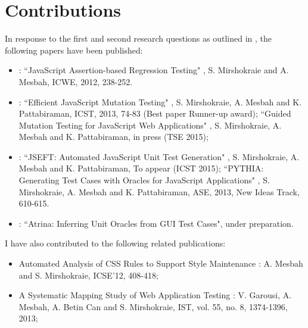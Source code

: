 \section{Contributions} \label{Sec:contrib}
In response to the first and second research questions as outlined in , the following papers have been published:
\begin{itemize}
\item {}: ``JavaScript Assertion-based Regression Testing" \cite{mirshokraie:icwe12},
S. Mirshokraie and A. Mesbah, ICWE, 2012, 238-252.
\item {}: ``Efficient JavaScript Mutation Testing" \cite{mirshokraie:icst13},
S. Mirshokraie, A. Mesbah and K. Pattabiraman, ICST, 2013, 74-83 (Best paper Runner-up award);
``Guided Mutation Testing for JavaScript Web Applications" \cite{mirshokraie:tse15},
S. Mirshokraie, A. Mesbah and K. Pattabiraman, in press (TSE 2015);
\item {}: ``JSEFT: Automated JavaScript Unit Test Generation" \cite{mirshokraie:icst15},
S. Mirshokraie, A. Mesbah and K. Pattabiraman, To appear (ICST 2015); ``PY\-THIA: Generating Test Cases with Oracles
for JavaScript Applications" \cite{shabnam:ase13},
S. Mirshokraie, A. Mesbah and K. Pattabiraman, ASE, 2013, New Ideas Track, 610-615.
\item {}: ``Atrina: Inferring Unit Oracles from GUI Test Cases", under preparation.
\end{itemize}

I have also contributed to the following related publications:
\begin{itemize}
\item Automated Analysis of CSS Rules to Support Style Maintenance \cite{mesbah:icse12}: 
A. Mesbah and S. Mirshokraie, ICSE'12, 408-418;
\item A Systematic Mapping Study of Web Application Testing \cite{garousi:ist13}: 
V. Garousi, A. Mesbah, A. Betin Can and S. Mirshokraie, IST, vol. 55, no. 8, 1374-1396, 2013;
\end{itemize}
